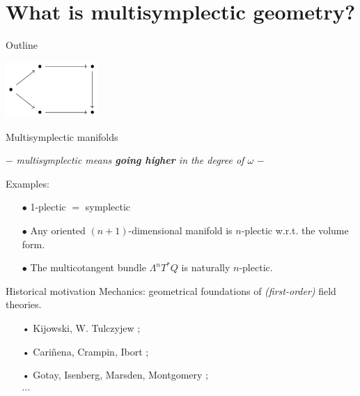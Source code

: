 \documentclass[10pt]{beamer}
\renewcommand{\checkpoint}[0]{
	\setcounter{tocdepth}{1}
	\addtocounter{framenumber}{-1}
 	\begin{frame}[t]{Outline}
  		\tableofcontents[currentsection]
		\begin{center}
			\includegraphics[width=3.5cm]{Pictures/Figure_pentagondiagm_page}
		\end{center}
	\end{frame}
}
\begin{document}
\section{What is \textbf{multisymplectic geometry}?}
\checkpoint	


\begin{frame}[t, fragile]{Multisymplectic manifolds} %
	\begin{center}
		$-$ \emph{multisymplectic means \textbf{going higher} in the degree of $\omega$} $-$
	\end{center}
	\pause
	\begin{defblock}
			
	\end{defblock}
	\vfill
	\pause
	\begin{block}{Examples:}
		\begin{itemize}
			\item[$\bullet$] 1-plectic $=$ symplectic
			\item[$\bullet$] Any oriented $(n+1)$-dimensional manifold is $n$-plectic w.r.t. the volume form.
			\item[$\bullet$] The multicotangent bundle $\Lambda^n T^\ast Q$ is naturally $n$-plectic.
		\end{itemize}
	\end{block}			 
%
	\pause
	\begin{block}{Historical motivation}
		Mechanics: geometrical foundations of \textit{(first-order)} field theories.
		\begin{itemize}
		 \item[•] Kijowski, W. Tulczyjew \cite{Kijowski1979}; %
		 \item[•] Cariñena, Crampin, Ibort \cite{Carinena1991b};%
		 \item[•] Gotay, Isenberg, Marsden, Montgomery \cite{Gimmsy1};%
		 \\ $\cdots$
		\end{itemize}
	\end{block}
\end{frame}


\end{document}
